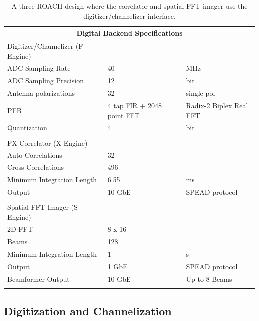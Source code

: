 \documentclass[useAMS,macros,usenatbib,onecolumn]{mn2e}
\begin{document}
\begin{table}
\begin{center}
\begin{tabular}{| l | l | l |}
\hline
\multicolumn{3}{|c|}{Digital Backend Specifications}\\
\hline
Digitizer/Channelizer (F-Engine) & &\\
\hline
ADC Sampling Rate	& 40 			& MHz\\
ADC Sampling Precision	& 12 			& bit \\
Antenna-polarizations 	& 32 			& single pol \\
PFB 			& 4 tap FIR + 2048 point FFT	& Radix-2 Biplex Real FFT\\
Quantization 		& 4 			& bit\\
& & \\
\hline
FX Correlator (X-Engine) & &\\
\hline
Auto Correlations 	& 32 			& \\
Cross Correlations 	& 496 			& \\
Minimum Integration Length & 6.55 		& ms\\
Output 			& 10 GbE 		& SPEAD protocol\\
& & \\
\hline
Spatial FFT Imager (S-Engine) & &\\
\hline
2D FFT 			& 8 x 16 		& \\
Beams 			& 128 			& \\
Minimum Integration Length & 1 			& s\\
Output 			& 1 GbE 		& SPEAD protocol\\
Beamformer Output 	& 10 GbE 		& Up to 8 Beams\\
& & \\
\hline
\end{tabular}
\caption{A three ROACH design where the correlator and spatial FFT imager use the digitizer/channelizer interface.}
\label{tbl:digital_specs}
\end{center}
\end{table}

\subsection{Digitization and Channelization}
\label{channelization}
\end{document}

